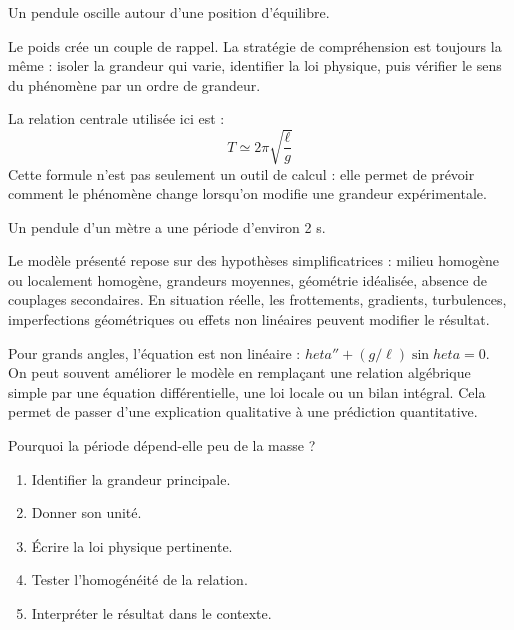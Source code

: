 \documentclass[11pt,a4paper]{article}
\begin{document}
\begin{exemplebox}
Un pendule oscille autour d'une position d'équilibre.
\end{exemplebox}

\begin{methodebox}
Le poids crée un couple de rappel.
La stratégie de compréhension est toujours la même : isoler la grandeur qui varie, identifier la loi physique, puis vérifier le sens du phénomène par un ordre de grandeur.
\end{methodebox}

\begin{theorembox}
La relation centrale utilisée ici est :
\[
T\simeq2\pi\sqrt{\frac{\ell}{g}}
\]
Cette formule n'est pas seulement un outil de calcul : elle permet de prévoir comment le phénomène change lorsqu'on modifie une grandeur expérimentale.
\end{theorembox}

\begin{odgbox}
Un pendule d'un mètre a une période d'environ 2 s.
\end{odgbox}

\begin{attentionbox}
Le modèle présenté repose sur des hypothèses simplificatrices : milieu homogène ou localement homogène, grandeurs moyennes, géométrie idéalisée, absence de couplages secondaires. En situation réelle, les frottements, gradients, turbulences, imperfections géométriques ou effets non linéaires peuvent modifier le résultat.
\end{attentionbox}

\begin{approfondissementbox}
Pour grands angles, l'équation est non linéaire : $	heta''+(g/\ell)\sin	heta=0$.
On peut souvent améliorer le modèle en remplaçant une relation algébrique simple par une équation différentielle, une loi locale ou un bilan intégral. Cela permet de passer d'une explication qualitative à une prédiction quantitative.
\end{approfondissementbox}

\begin{exercicebox}
Pourquoi la période dépend-elle peu de la masse ?
\begin{enumerate}
  \item Identifier la grandeur principale.
  \item Donner son unité.
  \item Écrire la loi physique pertinente.
  \item Tester l'homogénéité de la relation.
  \item Interpréter le résultat dans le contexte.
\end{enumerate}
\end{exercicebox}
\end{document}
